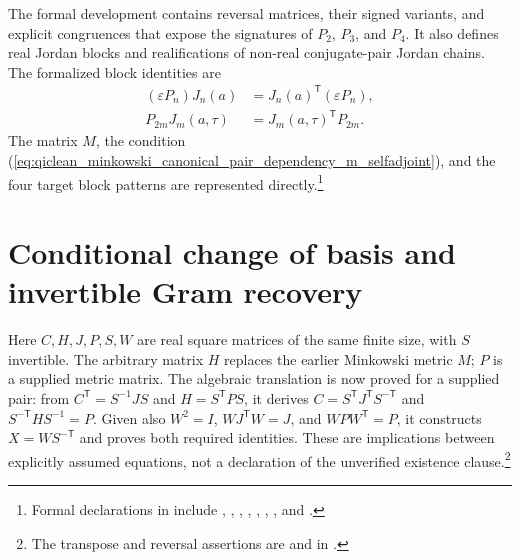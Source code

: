 \documentclass{article}
\begin{document}
The formal development contains reversal matrices, their signed variants, and
explicit congruences that expose the signatures of $P_2$, $P_3$, and $P_4$.
It also defines real Jordan blocks and realifications of non-real
conjugate-pair Jordan chains. The formalized block identities are
\begin{align}
    (\varepsilon P_n)J_n(a)
        &=J_n(a)^{\mathsf T}(\varepsilon P_n),
    \label{eq:qiclean_minkowski_canonical_pair_dependency_real_jordan_metric_identity}\\
    P_{2m}J_m(a,\tau)
        &=J_m(a,\tau)^{\mathsf T}P_{2m}.
    \label{eq:qiclean_minkowski_canonical_pair_dependency_complex_jordan_metric_identity}
\end{align}
The matrix $M$, the condition
(\ref{eq:qiclean_minkowski_canonical_pair_dependency_m_selfadjoint}), and the
four target block patterns are represented directly.\footnote{Formal
declarations in
 include
, ,
,
,
,
, , and
.}

\section{Conditional change of basis and invertible Gram recovery}

Here $C,H,J,P,S,W$ are real square matrices of the same finite size,
with $S$ invertible. The arbitrary matrix $H$ replaces the earlier Minkowski
metric $M$; $P$ is a supplied metric matrix.
The algebraic translation is now proved for a supplied pair: from
$C^{\mathsf T}=S^{-1}JS$ and $H=S^{\mathsf T}PS$, it derives
$C=S^{\mathsf T}J^{\mathsf T}S^{-\mathsf T}$ and
$S^{-\mathsf T}HS^{-1}=P$. Given also $W^2=I$,
$WJ^{\mathsf T}W=J$, and $WPW^{\mathsf T}=P$, it constructs
$X=WS^{-\mathsf T}$ and proves both required identities. These are
implications between explicitly assumed equations, not a declaration of the
unverified existence clause.\footnote{The transpose and reversal assertions
are  and
 in
.}
\end{document}

